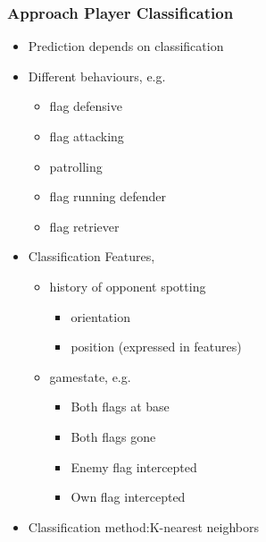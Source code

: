 \documentclass{beamer}
\begin{document}
        \begin{frame}
            \frametitle{Approach Player Classification}
            \begin{itemize}
                \item Prediction depends on classification
                \item Different behaviours, e.g.
                    \begin{itemize}
                        \item flag defensive
                        \item flag attacking
                        \item patrolling
                        \item flag running defender
                        \item flag retriever
                    \end{itemize}
                \item Classification Features,
                    \begin{itemize}
                        \item history of opponent spotting
                            \begin{itemize}
                                \item orientation
                                \item position (expressed in features)
                            \end{itemize}
                        \item gamestate, e.g.
                            \begin{itemize}
                                \item Both flags at base
                                \item Both flags gone
                                \item Enemy flag intercepted
                                \item Own flag intercepted
                            \end{itemize}
                    \end{itemize}
                \item Classification method:K-nearest neighbors
            \end{itemize}
        \end{frame}
\end{document}
